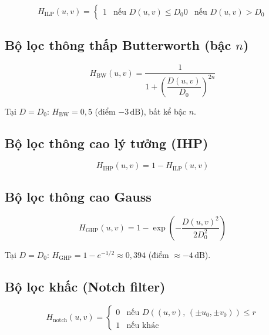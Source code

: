 \documentclass[12pt, a4paper]{article}
\begin{document}
\begin{equation}
  H_{\mathrm{ILP}}(u,v) = \begin{cases} 1 & \text{nếu } D(u,v) \le D_0  0 & \text{nếu } D(u,v) > D_0 \end{cases}
  \label{eq:ilp}
\end{equation}

\subsection{Bộ lọc thông thấp Butterworth (bậc $n$)}

\begin{equation}
  H_{\mathrm{BW}}(u,v) = \frac{1}{1 + \left(\dfrac{D(u,v)}{D_0}\right)^{2n}}
  \label{eq:bw}
\end{equation}

Tại $D = D_0$: $H_{\mathrm{BW}} = 0{,}5$ (điểm $-3\,\mathrm{dB}$),
bất kể bậc $n$.

\subsection{Bộ lọc thông cao lý tưởng (IHP)}

\begin{equation}
  H_{\mathrm{IHP}}(u,v) = 1 - H_{\mathrm{ILP}}(u,v)
  \label{eq:ihp}
\end{equation}

\subsection{Bộ lọc thông cao Gauss}

\begin{equation}
  H_{\mathrm{GHP}}(u,v) = 1 - \exp\!\left(-\frac{D(u,v)^2}{2D_0^2}\right)
  \label{eq:ghp}
\end{equation}

Tại $D = D_0$: $H_{\mathrm{GHP}} = 1 - e^{-1/2} \approx 0{,}394$
(điểm $\approx -4\,\mathrm{dB}$).

\subsection{Bộ lọc khấc (Notch filter)}

\begin{equation}
  H_{\mathrm{notch}}(u,v) =
  \begin{cases}
    0 & \text{nếu } D\!\left((u,v),\, (\pm u_0, \pm v_0)\right) \le r \\
    1 & \text{nếu khác}
  \end{cases}
  \label{eq:notch}
\end{equation}
\end{document}
